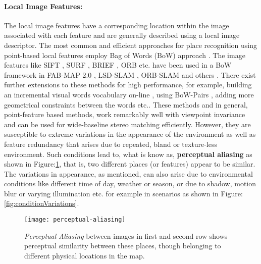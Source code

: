 \documentclass{article}
\begin{document}
\paragraph{Local Image Features:} The local image features have a corresponding location within the image associated with each feature and are generally described using a local image descriptor. The most common and efficient approaches for place recognition using point-based local features employ Bag of Words (BoW) approach \cite{Nister2006,Sivic2003}. The image features like SIFT \cite{Lowe2004}, SURF \cite{Bay2008}, BRIEF \cite{Calonder2010}, ORB \cite{Rublee2011} etc. have been used in a BoW framework in FAB-MAP 2.0 \cite{Cummins2010}, LSD-SLAM \cite{Engel2014lsd}, ORB-SLAM \cite{Mur-Artal2015} and others \cite{Galvez-Lopez2012, Mur-Artal2014}. There exist further extensions to these methods for high performance, for example, building an incremental visual words vocabulary on-line \cite{Angeli2008}, using BoW-Pairs \cite{kejriwal2016high}, adding more geometrical constraints between the words \cite{CADENA} etc.. These methods and in general, point-feature based methods, work remarkably well with viewpoint invariance and can be used for wide-baseline stereo matching efficiently. However, they are susceptible to extreme variations in the appearance of the environment as well as feature redundancy that arises due to repeated, bland or texture-less environment. Such conditions lead to, what is know as, \textbf{perceptual aliasing} as shown in Figure:\ref{fig:perceptualAliasing}, that is, two different places (or features) appear to be similar. The variations in appearance, as mentioned, can also arise due to environmental conditions like different time of day, weather or season, or due to shadow, motion blur or varying illumination etc. for example in scenarios as shown in Figure:\ref{fig:conditionVariations}.

\begin{figure}[htbp]
\centering
 \texttt{[image: perceptual-aliasing]}
 \caption{\emph{Perceptual Aliasing} between images in first and second row shows perceptual similarity between these places, though belonging to different physical locations in the map. \cite{cummins2007probabilistic}}
 \label{fig:perceptualAliasing}
\end{figure}
\end{document}
